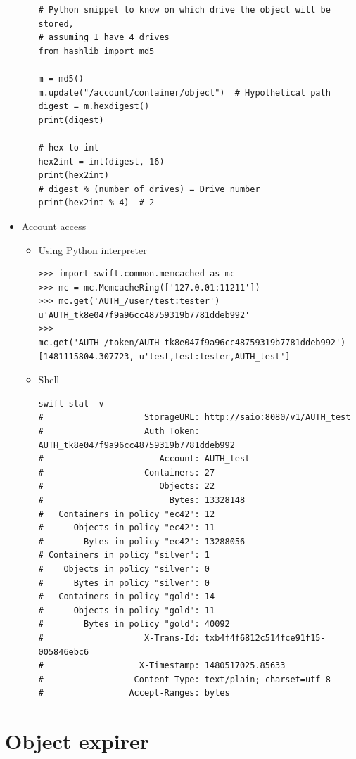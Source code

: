 \documentclass{article}
\begin{document}
\begin{itemize}
\begin{itemize}
\begin{verbatim}
# Python snippet to know on which drive the object will be stored,
# assuming I have 4 drives
from hashlib import md5

m = md5()
m.update("/account/container/object")  # Hypothetical path
digest = m.hexdigest()
print(digest)

# hex to int
hex2int = int(digest, 16)
print(hex2int)
# digest % (number of drives) = Drive number
print(hex2int % 4)  # 2
\end{verbatim}
\end{itemize}

\item Account access
\begin{itemize}
\item Using Python interpreter
\begin{verbatim}
>>> import swift.common.memcached as mc
>>> mc = mc.MemcacheRing(['127.0.01:11211'])
>>> mc.get('AUTH_/user/test:tester')
u'AUTH_tk8e047f9a96cc48759319b7781ddeb992'
>>> mc.get('AUTH_/token/AUTH_tk8e047f9a96cc48759319b7781ddeb992')
[1481115804.307723, u'test,test:tester,AUTH_test']
\end{verbatim}

\item Shell
\begin{verbatim}
swift stat -v
#                    StorageURL: http://saio:8080/v1/AUTH_test
#                    Auth Token: AUTH_tk8e047f9a96cc48759319b7781ddeb992
#                       Account: AUTH_test
#                    Containers: 27
#                       Objects: 22
#                         Bytes: 13328148
#   Containers in policy "ec42": 12
#      Objects in policy "ec42": 11
#        Bytes in policy "ec42": 13288056
# Containers in policy "silver": 1
#    Objects in policy "silver": 0
#      Bytes in policy "silver": 0
#   Containers in policy "gold": 14
#      Objects in policy "gold": 11
#        Bytes in policy "gold": 40092
#                    X-Trans-Id: txb4f4f6812c514fce91f15-005846ebc6
#                   X-Timestamp: 1480517025.85633
#                  Content-Type: text/plain; charset=utf-8
#                 Accept-Ranges: bytes
\end{verbatim}
\end{itemize}
\end{itemize}

\section{Object expirer}
\label{sec:org20bd31d}
\end{document}

